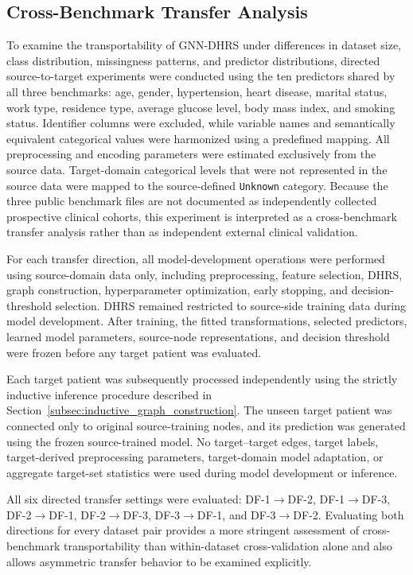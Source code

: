 \documentclass[pdflatex,sn-mathphys-num]{sn-jnl}%
\theoremstyle{thmstyleone}%
\theoremstyle{thmstyletwo}%
\theoremstyle{thmstylethree}%
\begin{document}
\subsection{Cross-Benchmark Transfer Analysis}
\label{subsec:cross_dataset_results}

 {
To examine the transportability of GNN-DHRS under differences in dataset
size, class distribution, missingness patterns, and predictor distributions,
directed source-to-target experiments were conducted using the ten predictors
shared by all three benchmarks: age, gender, hypertension, heart disease,
marital status, work type, residence type, average glucose level, body mass
index, and smoking status. Identifier columns were excluded, while variable
names and semantically equivalent categorical values were harmonized using a
predefined mapping. All preprocessing and encoding parameters were estimated
exclusively from the source data. Target-domain categorical levels that were
not represented in the source data were mapped to the source-defined
\texttt{Unknown} category. Because the three public benchmark files are not
documented as independently collected prospective clinical cohorts, this
experiment is interpreted as a cross-benchmark transfer analysis rather than
as independent external clinical validation.
}

 {
For each transfer direction, all model-development operations were performed
using source-domain data only, including preprocessing, feature selection,
DHRS, graph construction, hyperparameter optimization, early stopping, and
decision-threshold selection. DHRS remained restricted to source-side
training data during model development. After training, the fitted
transformations, selected predictors, learned model parameters, source-node
representations, and decision threshold were frozen before any target patient
was evaluated.
}

 {
Each target patient was subsequently processed independently using the
strictly inductive inference procedure described in
Section~\ref{subsec:inductive_graph_construction}. The unseen target patient
was connected only to original source-training nodes, and its prediction was
generated using the frozen source-trained model. No target--target edges,
target labels, target-derived preprocessing parameters, target-domain model
adaptation, or aggregate target-set statistics were used during model
development or inference.
}

 {
All six directed transfer settings were evaluated:
DF-1\(\rightarrow\)DF-2, DF-1\(\rightarrow\)DF-3,
DF-2\(\rightarrow\)DF-1, DF-2\(\rightarrow\)DF-3,
DF-3\(\rightarrow\)DF-1, and DF-3\(\rightarrow\)DF-2.
Evaluating both directions for every dataset pair provides a more stringent
assessment of cross-benchmark transportability than within-dataset
cross-validation alone and also allows asymmetric transfer behavior to be
examined explicitly.
}
\end{document}
